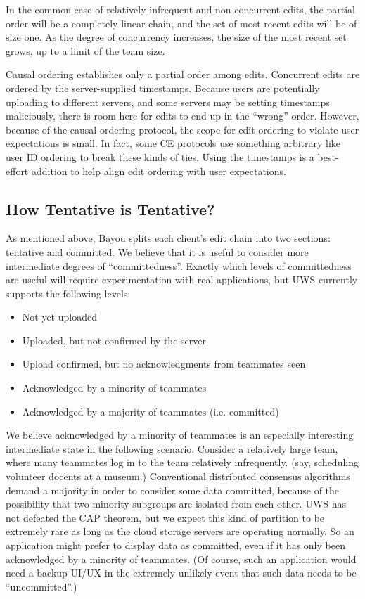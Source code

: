 \documentclass[runningheads]{llncs}
\begin{document}
In the common case of relatively infrequent and non-concurrent edits, the partial order will be a completely linear chain, and the set of most recent edits will be of size one.
As the degree of concurrency increases, the size of the most recent set grows, up to a limit of the team size.

Causal ordering establishes only a partial order among edits.
Concurrent edits are ordered by the server-supplied timestamps.
Because users are potentially uploading to different servers, and some servers may be setting timestamps maliciously, there is room here for edits to end up in the ``wrong'' order.
However, because of the causal ordering protocol, the scope for edit ordering to violate user expectations is small.
In fact, some CE protocols use something arbitrary like user ID ordering to break these kinds of ties.
Using the timestamps is a best-effort addition to help align edit ordering with user expectations.

\subsection{How Tentative is Tentative?}

As mentioned above, Bayou splits each client's edit chain into two sections: tentative and committed.
We believe that it is useful to consider more intermediate degrees of ``committedness''.
Exactly which levels of committedness are useful will require experimentation with real applications, but UWS currently supports the following levels:

\begin{itemize}
\item Not yet uploaded
\item Uploaded, but not confirmed by the server
\item Upload confirmed, but no acknowledgments from teammates seen
\item Acknowledged by a minority of teammates
\item Acknowledged by a majority of teammates (i.e. committed)
\end{itemize}

We believe acknowledged by a minority of teammates is an especially interesting intermediate state in the following scenario.
Consider a relatively large team, where many teammates log in to the team relatively infrequently.
(say, scheduling volunteer docents at a museum.)
Conventional distributed consensus algorithms demand a majority in order to consider some data committed, because of the possibility that two minority subgroups are isolated from each other.
UWS has not defeated the CAP theorem, but we expect this kind of partition to be extremely rare as long as the cloud storage servers are operating normally.
So an application might prefer to display data as committed, even if it has only been acknowledged by a minority of teammates.
(Of course, such an application would need a backup UI{\slash}UX in the extremely unlikely event that such data needs to be ``uncommitted''.)
\end{document}
